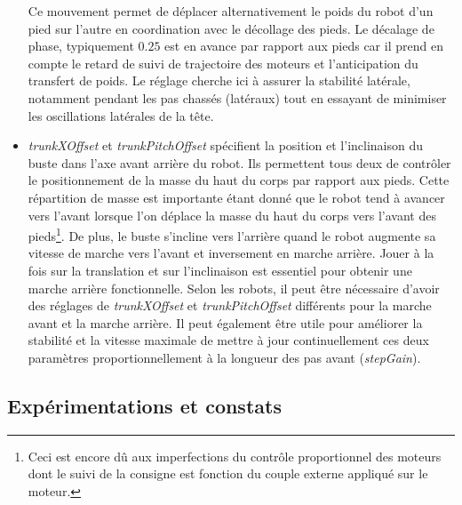 \begin{itemize}
        Ce mouvement permet de déplacer alternativement le poids du robot d'un pied
        sur l'autre en coordination avec le décollage des pieds.
        Le décalage de phase, typiquement $0.25$ est en avance par rapport aux pieds
        car il prend en compte le retard de suivi de trajectoire des moteurs 
        et l'anticipation du transfert de poids.
        Le réglage cherche ici à assurer la stabilité latérale, notamment pendant 
        les pas chassés (latéraux) tout en essayant de minimiser les oscillations 
        latérales de la tête.
    \item \textit{trunkXOffset} et \textit{trunkPitchOffset} spécifient la position et 
        l'inclinaison du buste dans l'axe avant arrière du robot. 
        Ils permettent tous deux de contrôler le positionnement de la masse du haut du corps
        par rapport aux pieds. 
        Cette répartition de masse est importante étant donné que
        le robot tend à avancer vers l'avant lorsque l'on déplace la masse du haut 
        du corps vers l'avant des pieds\footnote{Ceci est encore dû aux imperfections 
        du contrôle proportionnel des moteurs dont le suivi de la consigne
        est fonction du couple externe appliqué sur le moteur.}.
        De plus, le buste s'incline vers l'arrière quand le robot augmente sa 
        vitesse de marche vers l'avant et inversement en marche arrière.
        Jouer à la fois sur la translation et sur l'inclinaison est essentiel
        pour obtenir une marche arrière fonctionnelle.
        Selon les robots, il peut être nécessaire d'avoir des réglages de 
        \textit{trunkXOffset} et \textit{trunkPitchOffset} différents pour la
        marche avant et la marche arrière. 
        Il peut également être utile pour améliorer la stabilité et la vitesse maximale 
        de mettre à jour continuellement ces deux paramètres proportionnellement 
        à la longueur des pas avant (\textit{stepGain}).
\end{itemize}

\subsection{Expérimentations et constats}

